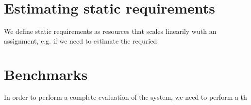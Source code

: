 \section{Estimating static requirements}
We define static requirements as resources that scales linearily wuth
an assignment, e.g. if we need to estimate the requried


\section{Benchmarks}
In order to perform a complete evaluation of the system, we need to
perform a th



